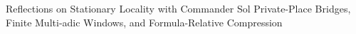 \documentclass[11pt]{article}
\begin{document}
\SLmaketitle
  {Reflections on Stationary Locality with Commander Sol}
  {Private-Place Bridges, Finite Multi-adic Windows, and Formula-Relative Compression}

\tableofcontents
\clearpage


\end{document}
